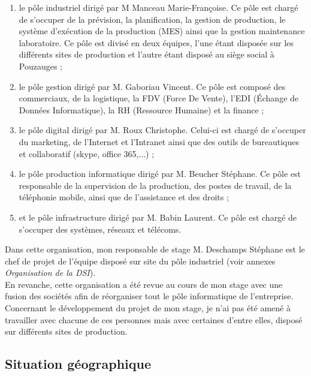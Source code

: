\documentclass[a4paper,12pt]{extarticle}
\begin{document}
\begin{enumerate}[-]
	\item le pôle industriel dirigé par M Manceau Marie-Françoise. Ce pôle est chargé de s’occuper de la prévision, la planification, la gestion de production, le système d’exécution de la production (MES) ainsi que la gestion maintenance laboratoire. Ce pôle est divisé en deux équipes, l’une étant disposée sur les différents sites de production et l’autre étant disposé au siège social à Pouzauges ;
	\item le pôle gestion dirigé par M. Gaboriau Vincent. Ce pôle est composé des commerciaux, de la logistique, la FDV (Force De Vente), l’EDI (Échange de Données Informatique), la RH (Ressource Humaine) et la finance ;
	\item le pôle digital dirigé par M. Roux Christophe. Celui-ci est chargé de s’occuper du marketing, de l’Internet et l’Intranet ainsi que des outils de bureautiques et collaboratif (skype, office 365,...) ;
	\item le pôle production informatique dirigé par M. Beucher Stéphane. Ce pôle est responsable de la supervision de la production, des postes de travail, de la téléphonie mobile, ainsi que de l’assistance et des droits ;
	\item et le pôle infrastructure dirigé par M. Babin Laurent. Ce pôle est chargé de s’occuper des systèmes, réseaux et télécoms.
\end{enumerate}

Dans cette organisation, mon responsable de stage M. Deschamps Stéphane est le chef de projet de l’équipe disposé sur site du pôle industriel (voir annexes \emph{Organisation de la DSI}).\\
En revanche, cette organisation a été revue au cours de mon stage avec une fusion des sociétés afin de réorganiser tout le pôle informatique de l’entreprise.\\
Concernant le développement du projet de mon stage, je n’ai pas été amené à travailler avec chacune de ces personnes mais avec certaines d’entre elles, disposé sur différents sites de production.

	\subsection{Situation géographique}
		\paragraph{}
\end{document}
